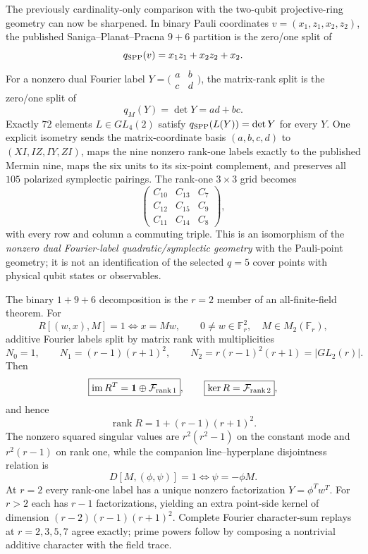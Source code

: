 The previously cardinality-only comparison with the two-qubit projective-ring
geometry can now be sharpened.  In binary Pauli coordinates
$v=(x_1,z_1,x_2,z_2)$, the published Saniga--Planat--Pracna $9+6$ partition is
the zero/one split of
\[
q_{\rm SPP}(v)=x_1z_1+x_2z_2+x_2.
\]
For a nonzero dual Fourier label
$Y=\bigl(\begin{smallmatrix}a&b\\c&d\end{smallmatrix}\bigr)$, the matrix-rank
split is the zero/one split of
\[
q_M(Y)=\det Y=ad+bc.
\]
Exactly $72$ elements $L\in GL_4(2)$ satisfy
$q_{\rm SPP}(L(Y))=\det Y$ for every $Y$.  One explicit isometry sends the
matrix-coordinate basis $(a,b,c,d)$ to $(XI,IZ,IY,ZI)$, maps the nine
nonzero rank-one labels exactly to the published Mermin nine, maps the six
units to its six-point complement, and preserves all $105$ polarized
symplectic pairings.  The rank-one $3\times3$ grid becomes
\[
\begin{pmatrix}
C_{10}&C_{13}&C_7\\
C_{12}&C_{15}&C_9\\
C_{11}&C_{14}&C_8
\end{pmatrix},
\]
with every row and column a commuting triple.  This is an isomorphism of the
\emph{nonzero dual Fourier-label quadratic/symplectic geometry} with the
Pauli-point geometry; it is not an identification of the selected $q=5$ cover
points with physical qubit states or observables.

The binary $1+9+6$ decomposition is the $r=2$ member of an all-finite-field
theorem.  For
\[
R[(w,x),M]=1\iff x=Mw,
\qquad 0\ne w\in\mathbb F_r^2,\quad M\in M_2(\mathbb F_r),
\]
additive Fourier labels split by matrix rank with multiplicities
\[
N_0=1,
\qquad N_1=(r-1)(r+1)^2,
\qquad N_2=r(r-1)^2(r+1)=|GL_2(r)|.
\]
Then
\[
\boxed{\operatorname{im}R^T=\mathbf1\oplus\mathcal F_{\rm rank\,1}},
\qquad
\boxed{\ker R=\mathcal F_{\rm rank\,2}},
\]
and hence
\[
\boxed{\operatorname{rank}R=1+(r-1)(r+1)^2}.
\]
The nonzero squared singular values are $r^2(r^2-1)$ on the constant mode and
$r^2(r-1)$ on rank one, while the companion line--hyperplane disjointness
relation is
\[
D[M,(\phi,\psi)]=1\iff \psi=-\phi M.
\]
At $r=2$ every rank-one label has a unique nonzero factorization
$Y=\phi^Tw^T$.  For $r>2$ each has $r-1$ factorizations, yielding an extra
point-side kernel of dimension $(r-2)(r-1)(r+1)^2$.  Complete Fourier
character-sum replays at $r=2,3,5,7$ agree exactly; prime powers follow by
composing a nontrivial additive character with the field trace.

